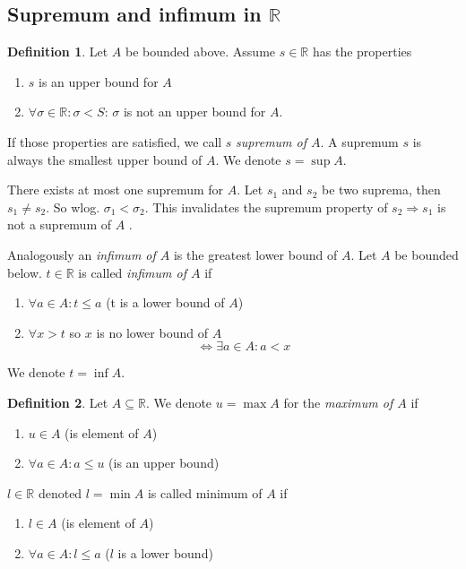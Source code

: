 \documentclass[a4paper,landscape,twocolumn]{article}
\theoremstyle{definition}
\newtheorem{defi}{Definition}
\begin{document}
\subsection{Supremum and infimum in $\mathbb R$}
\begin{defi}
  Let $A$ be bounded above.
  Assume $s \in \mathbb R$ has the properties
  \begin{enumerate}
    \item $s$ is an upper bound for $A$
    \item $\forall \sigma \in \mathbb R: \sigma < S$: $\sigma$ is not an upper bound for $A$.
  \end{enumerate}
  If those properties are satisfied, we call $s$ \emph{supremum of $A$}.
  A supremum $s$ is always the smallest upper bound of $A$.
  We denote $s = \sup{A}$.

  There exists at most one supremum for $A$. Let $s_1$ and $s_2$ be two suprema,
  then $s_1 \neq s_2$. So wlog. $\sigma_1 < \sigma_2$. This invalidates the supremum
  property of $s_2 \Rightarrow s_1$ is not a supremum of $A$ \lightning.

  Analogously an \emph{infimum of $A$} is the greatest lower bound of $A$.
  Let $A$ be bounded below. $t \in \mathbb R$ is called \emph{infimum of $A$}
  if
  \begin{enumerate}
    \item $\forall a \in A: t \leq a$ (t is a lower bound of $A$)
    \item $\forall x > t$ so $x$ is no lower bound of $A$
      \[ \Leftrightarrow \exists a \in A: a < x \]
  \end{enumerate}
  We denote $t = \inf{A}$.
\end{defi}

\begin{defi}
  Let $A \subseteq \mathbb R$. We denote $u = \max{A}$ for the \emph{maximum of $A$} if
  \begin{enumerate}
    \item $u \in A$ (is element of $A$)
    \item $\forall a \in A: a \leq u$ (is an upper bound)
  \end{enumerate}
  $l \in \mathbb R$ denoted $l = \min{A}$ is called minimum of $A$ if
  \begin{enumerate}
    \item $l \in A$ (is element of $A$)
    \item $\forall a \in A: l \leq a$ ($l$ is a lower bound)
  \end{enumerate}
\end{defi}
\end{document}
